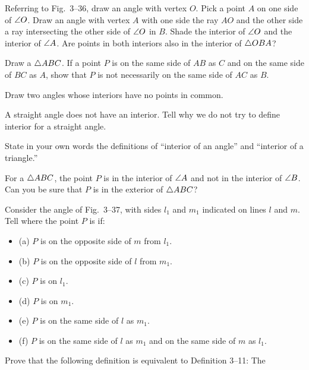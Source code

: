 \documentclass[11pt]{book}
\theoremstyle{bkplain}
\begin{document}
\begin{exercisecols}
\begin{exlist}
\item Referring to Fig.~3--36, draw an angle with vertex $O$. Pick a point $A$ on
      one side of $\angle O$. Draw an angle with vertex $A$ with one side the ray
      $AO$ and the other side a ray intersecting the other side of $\angle O$ in
      $B$. Shade the interior of $\angle O$ and the interior of $\angle A$. Are
      points in both interiors also in the interior of $\triangle OBA$?
\exfig{\FIGIIITHIRTYSIX}
\item Draw a $\triangle ABC$. If a point $P$ is on the same side of $AB$ as $C$ and
      on the same side of $BC$ as $A$, show that $P$ is not necessarily on the
      same side of $AC$ as $B$.
\item Draw two angles whose interiors have no points in common.
\item A straight angle does not have an interior. Tell why we do not try to
      define interior for a straight angle.
\item State in your own words the definitions of ``interior of an angle'' and
      ``interior of a triangle.''
\item For a $\triangle ABC$, the point $P$ is in the interior of $\angle A$ and not in
      the interior of $\angle B$. Can you be sure that $P$ is in the exterior of
      $\triangle ABC$?
\item Consider the angle of Fig.~3--37, with sides $l_1$ and $m_1$ indicated on
      lines $l$ and $m$. Tell where the point $P$ is if:
      \begin{itemize}[label=,leftmargin=1.1em,itemsep=0pt,topsep=1pt]
      \item (a) $P$ is on the opposite side of $m$ from $l_1$.
      \item (b) $P$ is on the opposite side of $l$ from $m_1$.
      \item (c) $P$ is on $l_1$.
      \item (d) $P$ is on $m_1$.
      \item (e) $P$ is on the same side of $l$ as $m_1$.
      \item (f) $P$ is on the same side of $l$ as $m_1$ and on the same side of
            $m$ as $l_1$.
      \end{itemize}
\exfig{\FIGIIITHIRTYSEVEN}
\item Prove that the following definition is equivalent to Definition 3--11: The

\end{exlist}
\end{exercisecols}
\end{document}
